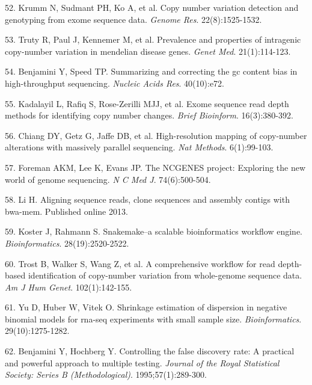 \documentclass[11pt,letterpaper]{book}
\begin{document}
\leavevmode\hypertarget{ref-krumm:2012aa}{}%
52. Krumm N, Sudmant PH, Ko A, et al. Copy number variation detection and genotyping from exome sequence data. \emph{Genome Res}. 22(8):1525-1532.

\leavevmode\hypertarget{ref-truty:2019aa}{}%
53. Truty R, Paul J, Kennemer M, et al. Prevalence and properties of intragenic copy-number variation in mendelian disease genes. \emph{Genet Med}. 21(1):114-123.

\leavevmode\hypertarget{ref-benjamini:2012aa}{}%
54. Benjamini Y, Speed TP. Summarizing and correcting the gc content bias in high-throughput sequencing. \emph{Nucleic Acids Res}. 40(10):e72.

\leavevmode\hypertarget{ref-kadalayil:2015aa}{}%
55. Kadalayil L, Rafiq S, Rose-Zerilli MJJ, et al. Exome sequence read depth methods for identifying copy number changes. \emph{Brief Bioinform}. 16(3):380-392.

\leavevmode\hypertarget{ref-chiang:2009aa}{}%
56. Chiang DY, Getz G, Jaffe DB, et al. High-resolution mapping of copy-number alterations with massively parallel sequencing. \emph{Nat Methods}. 6(1):99-103.

\leavevmode\hypertarget{ref-foreman:2013aa}{}%
57. Foreman AKM, Lee K, Evans JP. The NCGENES project: Exploring the new world of genome sequencing. \emph{N C Med J}. 74(6):500-504.

\leavevmode\hypertarget{ref-li:2013ab}{}%
58. Li H. Aligning sequence reads, clone sequences and assembly contigs with bwa-mem. Published online 2013.

\leavevmode\hypertarget{ref-koster:2012aa}{}%
59. Koster J, Rahmann S. Snakemake--a scalable bioinformatics workflow engine. \emph{Bioinformatics}. 28(19):2520-2522.

\leavevmode\hypertarget{ref-trost:2018aa}{}%
60. Trost B, Walker S, Wang Z, et al. A comprehensive workflow for read depth-based identification of copy-number variation from whole-genome sequence data. \emph{Am J Hum Genet}. 102(1):142-155.

\leavevmode\hypertarget{ref-yu:2013aa}{}%
61. Yu D, Huber W, Vitek O. Shrinkage estimation of dispersion in negative binomial models for rna-seq experiments with small sample size. \emph{Bioinformatics}. 29(10):1275-1282.

\leavevmode\hypertarget{ref-benjamini:1995aa}{}%
62. Benjamini Y, Hochberg Y. Controlling the false discovery rate: A practical and powerful approach to multiple testing. \emph{Journal of the Royal Statistical Society: Series B (Methodological)}. 1995;57(1):289-300.
\end{document}
